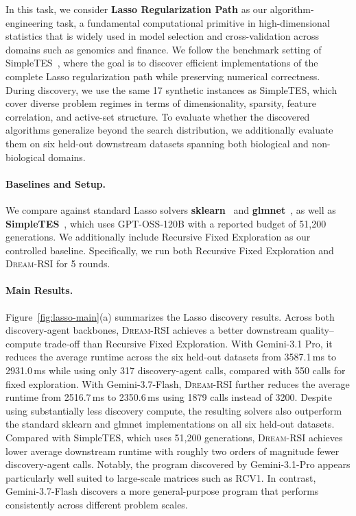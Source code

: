 In this task, we consider \textbf{Lasso Regularization Path} as our algorithm-engineering task, a fundamental computational primitive in high-dimensional statistics that is widely used in model selection and cross-validation across domains such as genomics and finance. We follow the benchmark setting of SimpleTES~\citep{ye2026evaluation}, where the goal is to discover efficient implementations of the complete Lasso regularization path while preserving numerical correctness. During discovery, we use the same 17 synthetic instances as SimpleTES, which cover diverse problem regimes in terms of dimensionality, sparsity, feature correlation, and active-set structure. To evaluate whether the discovered algorithms generalize beyond the search distribution, we additionally evaluate them on six held-out downstream datasets spanning both biological and non-biological domains. 

\paragraph{Baselines and Setup.}
We compare against standard Lasso solvers
\textbf{sklearn}~\citep{pedregosa2011scikit} and
\textbf{glmnet}~\citep{friedman2010regularization},
as well as \textbf{SimpleTES}~\citep{ye2026evaluation}, which uses
GPT-OSS-120B with a reported budget of 51,200 generations.
We additionally include Recursive Fixed Exploration as our controlled baseline. Specifically, we run both Recursive Fixed Exploration and \textsc{Dream-RSI} for 5 rounds.

\paragraph{Main Results.}
Figure~\ref{fig:lasso-main}(a) summarizes the Lasso discovery results.
Across both discovery-agent backbones, \textsc{Dream-RSI} achieves a better
downstream quality--compute trade-off than Recursive Fixed Exploration.
With Gemini-3.1 Pro, it reduces the average runtime across the six held-out
datasets from 3587.1\,ms to 2931.0\,ms while using only 317 discovery-agent
calls, compared with 550 calls for fixed exploration.
With Gemini-3.7-Flash, \textsc{Dream-RSI} further reduces the average runtime
from 2516.7\,ms to 2350.6\,ms using 1879 calls instead of 3200. Despite using substantially less discovery compute, the resulting solvers also
outperform the standard sklearn and glmnet implementations on all six held-out
datasets. Compared with SimpleTES, which uses 51,200 generations,
\textsc{Dream-RSI} achieves lower average downstream runtime with roughly
two orders of magnitude fewer discovery-agent calls. Notably, the program discovered by Gemini-3.1-Pro appears particularly well suited to large-scale matrices such as RCV1. In contrast, Gemini-3.7-Flash discovers a more general-purpose program that performs consistently across different problem scales.

